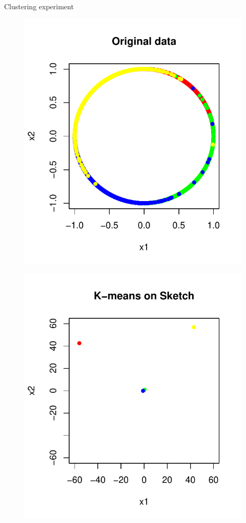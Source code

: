 \documentclass[first=dgreen,second=purple,logo=redque]{aaltoslides}
\begin{document}
\begin{frame}[allowframebreaks=1]{Clustering experiment}
\begin{figure}
  \includegraphics[scale=0.6]{plots/data_and_sketch}
 \label{fig:fp}
\end{figure}


\framebreak
\begin{figure}
  \includegraphics[scale=0.6]{plots/data_and_sketch2}
 \label{fig:fp}
\end{figure}


\end{frame}
\end{document}
